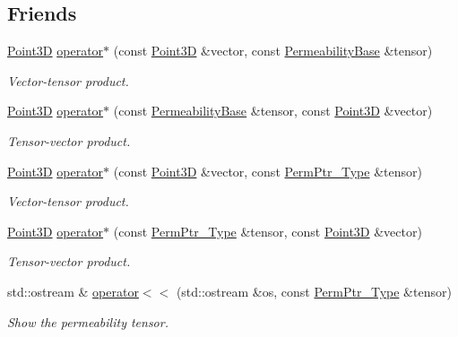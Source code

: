 \subsection*{Friends}
\begin{DoxyCompactItemize}
\item 
\hyperlink{classFVCode3D_1_1Point3D}{Point3D} \hyperlink{classFVCode3D_1_1PermeabilityBase_a04284b595d50559389f6098e76611b76}{operator$\ast$} (const \hyperlink{classFVCode3D_1_1Point3D}{Point3D} \&vector, const \hyperlink{classFVCode3D_1_1PermeabilityBase}{Permeability\+Base} \&tensor)
\begin{DoxyCompactList}\small\item\em Vector-\/tensor product. \end{DoxyCompactList}\item 
\hyperlink{classFVCode3D_1_1Point3D}{Point3D} \hyperlink{classFVCode3D_1_1PermeabilityBase_a72ee0b7351f22e26194b2407a041b3e0}{operator$\ast$} (const \hyperlink{classFVCode3D_1_1PermeabilityBase}{Permeability\+Base} \&tensor, const \hyperlink{classFVCode3D_1_1Point3D}{Point3D} \&vector)
\begin{DoxyCompactList}\small\item\em Tensor-\/vector product. \end{DoxyCompactList}\item 
\hyperlink{classFVCode3D_1_1Point3D}{Point3D} \hyperlink{classFVCode3D_1_1PermeabilityBase_ae9bcef7644b0548a473db5bdf1d85b5d}{operator$\ast$} (const \hyperlink{classFVCode3D_1_1Point3D}{Point3D} \&vector, const \hyperlink{namespaceFVCode3D_aee5ae48a57366603109f90f526a645b1}{Perm\+Ptr\+\_\+\+Type} \&tensor)
\begin{DoxyCompactList}\small\item\em Vector-\/tensor product. \end{DoxyCompactList}\item 
\hyperlink{classFVCode3D_1_1Point3D}{Point3D} \hyperlink{classFVCode3D_1_1PermeabilityBase_a83c27da33ea299dde90e6e790165dbb7}{operator$\ast$} (const \hyperlink{namespaceFVCode3D_aee5ae48a57366603109f90f526a645b1}{Perm\+Ptr\+\_\+\+Type} \&tensor, const \hyperlink{classFVCode3D_1_1Point3D}{Point3D} \&vector)
\begin{DoxyCompactList}\small\item\em Tensor-\/vector product. \end{DoxyCompactList}\item 
std\+::ostream \& \hyperlink{classFVCode3D_1_1PermeabilityBase_ab1aeb67feab1c176759477ad8e881f2b}{operator$<$$<$} (std\+::ostream \&os, const \hyperlink{namespaceFVCode3D_aee5ae48a57366603109f90f526a645b1}{Perm\+Ptr\+\_\+\+Type} \&tensor)
\begin{DoxyCompactList}\small\item\em Show the permeability tensor. \end{DoxyCompactList}\end{DoxyCompactItemize}


